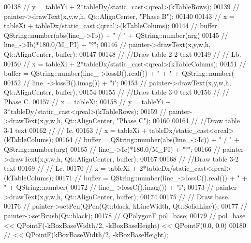 \begin{DoxyCode}
00138 \textcolor{comment}{//  y = tableYi + 2*tableDy/static\_cast<qreal>(kTableRows);}
00139 \textcolor{comment}{//  painter->drawText(x,y,w,h, Qt::AlignCenter, "Phase B");}
00140 
00143 \textcolor{comment}{//  x = tableXi + tableDx/static\_cast<qreal>(kTableColums);}
00144 \textcolor{comment}{//  buffer = QString::number(abs(line\_->Ib)) + " / " + QString::number(arg(}
00145 \textcolor{comment}{//             line\_->Ib)*180.0/M\_PI) + "°";}
00146 \textcolor{comment}{//  painter->drawText(x,y,w,h, Qt::AlignCenter, buffer);}
00147 
00148 \textcolor{comment}{//  //Draw table 2-2 text}
00149 \textcolor{comment}{//  // Lb.}
00150 \textcolor{comment}{//  x = tableXi + 2*tableDx/static\_cast<qreal>(kTableColums);}
00151 \textcolor{comment}{//  buffer = QString::number(line\_->lossB().real()) + " + " + QString::number(}
00152 \textcolor{comment}{//             line\_->lossB().imag()) + "i";}
00153 \textcolor{comment}{//  painter->drawText(x,y,w,h, Qt::AlignCenter, buffer);}
00154 
00155 \textcolor{comment}{//  //Draw table 3-0 text}
00156 \textcolor{comment}{//  // Phase C.}
00157 \textcolor{comment}{//  x = tableXi;}
00158 \textcolor{comment}{//  y = tableYi + 3*tableDy/static\_cast<qreal>(kTableRows);}
00159 \textcolor{comment}{//  painter->drawText(x,y,w,h, Qt::AlignCenter, "Phase C");}
00160 
00161 \textcolor{comment}{//  //Draw table 3-1 text}
00162 \textcolor{comment}{//  // Ic.}
00163 \textcolor{comment}{//  x = tableXi + tableDx/static\_cast<qreal>(kTableColums);}
00164 \textcolor{comment}{//  buffer = QString::number(abs(line\_->Ic)) + " / " + QString::number(arg(}
00165 \textcolor{comment}{//             line\_->Ic)*180.0/M\_PI) + "°";}
00166 \textcolor{comment}{//  painter->drawText(x,y,w,h, Qt::AlignCenter, buffer);}
00167 
00168 \textcolor{comment}{//  //Draw table 3-2 text}
00169 \textcolor{comment}{//  // Lc.}
00170 \textcolor{comment}{//  x = tableXi + 2*tableDx/static\_cast<qreal>(kTableColums);}
00171 \textcolor{comment}{//  buffer = QString::number(line\_->lossC().real()) + " + " + QString::number(}
00172 \textcolor{comment}{//             line\_->lossC().imag()) + "i";}
00173 \textcolor{comment}{//  painter->drawText(x,y,w,h, Qt::AlignCenter, buffer);}
00174 
00175 \textcolor{comment}{//  // Draw base.}
00176 \textcolor{comment}{//  painter->setPen(QPen(Qt::black, kLineWidth, Qt::SolidLine));}
00177 \textcolor{comment}{//  painter->setBrush(Qt::black);}
00178 \textcolor{comment}{//  QPolygonF pol\_base;}
00179 \textcolor{comment}{//  pol\_base << QPointF(-kBoxBaseWidth/2, -kBoxBaseHeight) << QPointF(0.0, 0.0)}
00180 \textcolor{comment}{//           << QPointF(kBoxBaseWidth/2, -kBoxBaseHeight);}

\end{DoxyCode}

